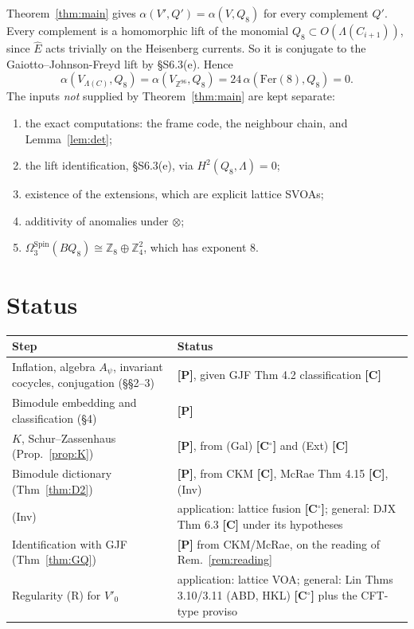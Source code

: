 \documentclass[11pt]{article}
\theoremstyle{definition}
\newcommand{\Z}{\mathbb Z}
\newcommand{\Ehat}{\widehat E}
\newcommand{\st}[1]{\textbf{[#1]}}
\begin{document}
Theorem~\ref{thm:main} gives $\alpha(V',Q')=\alpha(V,Q_8)$ for every complement $Q'$. Every complement
is a homomorphic lift of the monomial $Q_8\subset O(\Lambda(C_{i+1}))$, since $\Ehat$ acts trivially
on the Heisenberg currents. So it is conjugate to the Gaiotto--Johnson-Freyd lift by \S S6.3(e).
Hence
\[
\alpha(V_{\Lambda(C)},Q_8)=\alpha(V_{\Z^{96}},Q_8)=24\,\alpha(\mathrm{Fer}(8),Q_8)=0 .
\]
The inputs \emph{not} supplied by Theorem~\ref{thm:main} are kept separate:
\begin{enumerate}[nosep]
\item the exact computations: the frame code, the neighbour chain, and Lemma~\ref{lem:det};
\item the lift identification, \S S6.3(e), via $H^2(Q_8,\Lambda)=0$;
\item existence of the extensions, which are explicit lattice SVOAs;
\item additivity of anomalies under $\otimes$;
\item $\Omega_3^{\mathrm{Spin}}(BQ_8)\cong\Z_8\oplus\Z_4^2$, which has exponent $8$.
\end{enumerate}

\section{Status}\label{sec:status}
\begin{center}\small
\begin{tabular}{p{}p{}}
\hline
Step & Status\\\hline
Inflation, algebra $A_\psi$, invariant cocycles, conjugation (\S\S2--3) & \st{P}, given GJF Thm 4.2 classification \st{C}\\
Bimodule embedding and classification (\S4) & \st{P}\\
$K$, Schur--Zassenhaus (Prop.~\ref{prop:K}) & \st{P}, from (Gal) \st{C$^\circ$} and (Ext) \st{C}\\
Bimodule dictionary (Thm~\ref{thm:D2}) & \st{P}, from CKM \st{C}, McRae Thm 4.15 \st{C}, (Inv)\\
(Inv) & application: lattice fusion \st{C$^\circ$}; general: DJX Thm 6.3 \st{C} under its hypotheses\\
Identification with GJF (Thm~\ref{thm:GQ}) & \st{P} from CKM/McRae, on the reading of Rem.~\ref{rem:reading}\\
Regularity (R) for $V'_0$ & application: lattice VOA; general: Lin Thms 3.10/3.11 (ABD, HKL) \st{C$^\circ$} plus the CFT-type proviso\\
\hline
\end{tabular}
\end{center}
\end{document}
